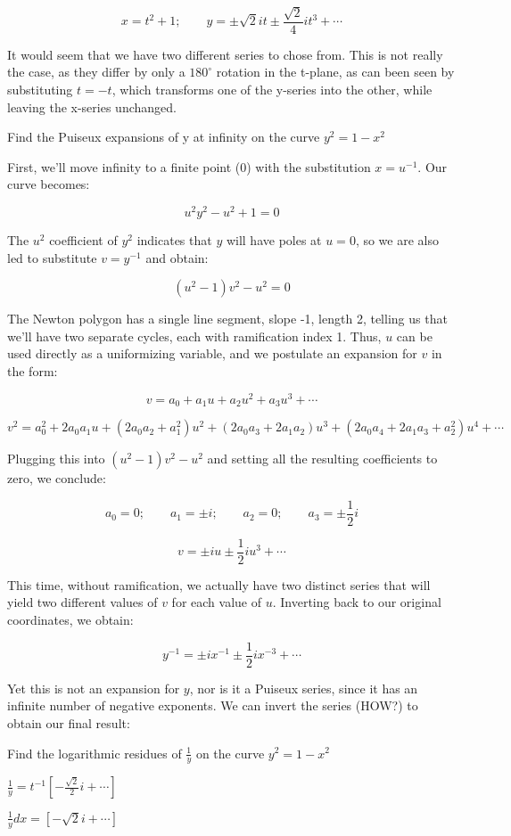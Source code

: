 $$x = t^2 +1; \qquad y = \pm\sqrt{2}it \pm \frac{\sqrt{2}}{4} it^3 + \cdots$$

It would seem that we have two different series to chose from.  This
is not really the case, as they differ by only a $180^\circ$ rotation
in the t-plane, as can been seen by substituting $t=-t$, which
transforms one of the y-series into the other, while leaving the
x-series unchanged.

\endexample

\example Find the Puiseux expansions of y at infinity on the
curve $y^2 = 1 - x^2$

First, we'll move infinity to a finite point (0) with the substitution
$x=u^{-1}$.  Our curve becomes:

$$u^2 y^2 - u^2 + 1 = 0$$

The $u^2$ coefficient of $y^2$ indicates that $y$ will have poles at
$u=0$, so we are also led to substitute $v=y^{-1}$ and obtain:

$$(u^2 - 1) v^2 - u^2 = 0$$

The Newton polygon has a single line segment, slope -1, length 2,
telling us that we'll have two separate cycles, each with ramification
index 1.  Thus, $u$ can be used directly as a uniformizing variable,
and we postulate an expansion for $v$ in the form:

$$v = a_0 + a_1 u + a_2 u^2 + a_3 u^3 + \cdots$$

$$v^2 = a_0^2 + 2 a_0 a_1 u + (2 a_0 a_2 + a_1^2) u^2 + (2 a_0 a_3 + 2 a_1 a_2) u^3 + (2 a_0 a_4 + 2 a_1 a_3 + a_2^2) u^4 + \cdots$$

Plugging this into $(u^2 - 1) v^2 - u^2$ and setting all the resulting
coefficients to zero, we conclude:

$$a_0 = 0; \qquad a_1 = \pm i; \qquad a_2 = 0; \qquad a_3 = \pm \frac{1}{2}i$$

$$v = \pm i u \pm \frac{1}{2} i u^3 + \cdots$$

This time, without ramification, we actually have two distinct series
that will yield two different values of $v$ for each value of $u$.
Inverting back to our original coordinates, we obtain:

$$y^{-1} = \pm i x^{-1} \pm \frac{1}{2} i x^{-3} + \cdots$$

Yet this is not an expansion for $y$, nor is it a Puiseux series,
since it has an infinite number of negative exponents.  We can invert
the series (HOW?) to obtain our final result:

\endexample

\example Find the logarithmic residues of $\frac{1}{y}$ on the curve
$y^2 = 1 - x^2$


$\frac{1}{y} = t^{-1} \left[ -\frac{\sqrt{2}}{2}i + \cdots \right]$

$\frac{1}{y} dx = \left[ -\sqrt{2}i + \cdots \right] $

\endexample
